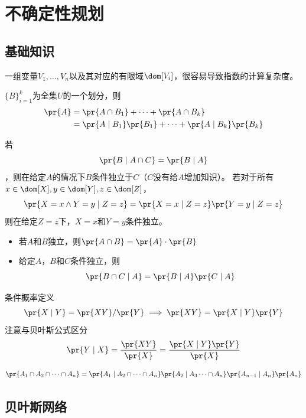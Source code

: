 
\section{不确定性规划}

\subsection{基础知识}
一组变量$V_1,\ldots,V_n$以及其对应的有限域$\dom[V_i]$，很容易导致指数的计算复杂度。
\begin{theorem}[全概率公式]
$\{B\}_{i=1}^k$为全集$U$的一个划分，则
\[\begin{aligned}
\pr{A}&=\pr{A\cap B_1}+\cdots+\pr{A\cap B_k}\\
&=\pr{A\mid B_1}\pr{B_1}+\cdots+\pr{A\mid B_k}\pr{B_k}
\end{aligned}\]
\end{theorem}
\begin{theorem}[条件独立]
若
\[\pr{B\mid A\cap C}=\pr{B\mid A}\]
，则在给定$A$的情况下$B$条件独立于$C$（$C$没有给$A$增加知识）。
若对于所有$x\in\dom[X],y\in\dom[Y],z\in\dom[Z]$，
\[\pr{X=x\land Y=y\mid Z=z}=\pr{X=x\mid Z=z}\pr{Y=y\mid Z=z}\]
则在给定$Z=z$下，$X=x$和$Y=y$条件独立。
\end{theorem}
\begin{proposition}[独立性性质]
\begin{itemize}
	\item 若$A$和$B$独立，则$\pr{A\cap B}=\pr{A}\cdot\pr{B}$
	\item 给定$A$，$B$和$C$条件独立，则
	\[\pr{B\cap C\mid A}=\pr{B\mid A}\pr{C\mid A}\]
\end{itemize}
\end{proposition}
\begin{theorem}[贝叶斯公式]
条件概率定义
\[\pr{X\mid Y}=\pr{XY}/\pr{Y}\implies \pr{XY}=\pr{X\mid Y}\pr{Y}\]
注意与贝叶斯公式区分
\[\pr{Y\mid X}=\frac{\pr{XY}}{\pr{X}}=\frac{\pr{X\mid Y}\pr{Y}}{\pr{X}}\]
\end{theorem}
\begin{theorem}[链式法则]
\[\pr{A_1\cap A_2\cap\cdots\cap A_n}=\pr{A_1\mid A_2\cap\cdots\cap A_n}\pr{A_2\mid A_3\cdots\cap A_n}\pr{A_{n-1}\mid A_n}\pr{A_n}\]
\end{theorem}

\subsection{贝叶斯网络}
